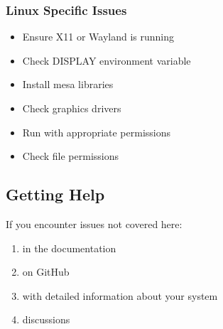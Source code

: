 \documentclass[a4paper,10pt,english,openany,oneside]{sphinxmanual}
\begin{document}
\subsubsection{Linux Specific Issues}
\label{\detokenize{installation:linux-specific-issues}}\begin{description}
\begin{itemize}
\item {} 
\sphinxAtStartPar
Ensure X11 or Wayland is running

\item {} 
\sphinxAtStartPar
Check DISPLAY environment variable

\end{itemize}

\begin{itemize}
\item {} 
\sphinxAtStartPar
Install mesa libraries

\item {} 
\sphinxAtStartPar
Check graphics drivers

\end{itemize}

\begin{itemize}
\item {} 
\sphinxAtStartPar
Run with appropriate permissions

\item {} 
\sphinxAtStartPar
Check file permissions

\end{itemize}

\end{description}


\subsection{Getting Help}
\label{\detokenize{installation:getting-help}}
\sphinxAtStartPar
If you encounter issues not covered here:
\begin{enumerate}
%
\item {} 
\sphinxAtStartPar
{} in the documentation

\item {} 
\sphinxAtStartPar
{} on GitHub

\item {} 
\sphinxAtStartPar
{} with detailed information about your system

\item {} 
\sphinxAtStartPar
{} discussions

\end{enumerate}
\end{document}
